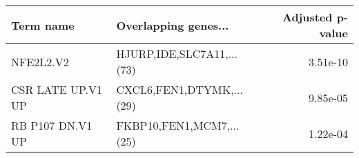 \begin{tabular}{llr}
\toprule
        Term name &      Overlapping genes... &  Adjusted p-value \\
\midrule
        NFE2L2.V2 & HJURP,IDE,SLC7A11,...(73) &          3.51e-10 \\
CSR LATE UP.V1 UP &  CXCL6,FEN1,DTYMK,...(29) &          9.85e-05 \\
 RB P107 DN.V1 UP &  FKBP10,FEN1,MCM7,...(25) &          1.22e-04 \\
\bottomrule
\end{tabular}
